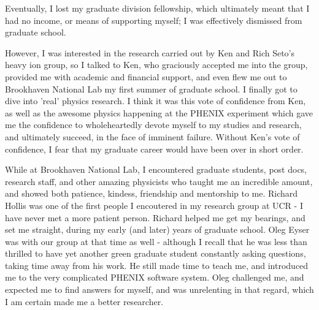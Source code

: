 Eventually, I lost my graduate division fellowship, which ultimately meant that
I had no income, or means of supporting myself; I was effectively dismissed from
graduate school. 

However, I was interested in the research carried out by Ken and Rich Seto's
heavy ion group, so I talked to Ken, who graciously accepted me into the group,
provided me with academic and financial support, and even flew me out to
Brookhaven National Lab my first summer of graduate school. I finally got to
dive into 'real' physics research. I think it was this vote of confidence from
Ken, as well as the awesome physics happening at the PHENIX experiment which
gave me the confidence to wholeheartedly devote myself to my studies and
research, and ultimately succeed, in the face of imminent failure. Without Ken's
vote of confidence, I fear that my graduate career would have been over in short
order.

While at Brookhaven National Lab, I encountered graduate students, post docs,
research staff, and other amazing physicists who taught me an incredible
amount, and showed both patience, kindess, friendship and mentorship to me.
Richard Hollis was one of the first people I encoutered in my research group at
UCR - I have never met a more patient person. Richard helped me get my
bearings, and set me straight, during my early (and later) years of graduate
school. Oleg Eyser was with our group at that time as well - although I recall
that he was less than thrilled to have yet another green graduate student
constantly asking questions, taking time away from his work. He still made time
to teach me, and introduced me to the very complicated PHENIX software system.
Oleg challenged me, and expected me to find answers for myself, and was
unrelenting in that regard, which I am certain made me a better researcher.

